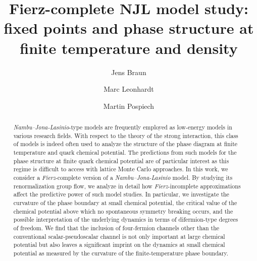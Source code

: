 \documentclass[prd,english,preprintnumbers,amsmath,amssymb,nofootinbib,twocolumn,superscriptaddress]{revtex4-1}
\begin{document}
\title{Fierz-complete NJL model study:\\ fixed points and phase structure at finite temperature
and density}

\author{Jens Braun}
\author{Marc Leonhardt} 
\author{Martin Pospiech}

%
\begin{abstract}
%
{\it Nambu--Jona-Lasinio}-type models are frequently employed as low-energy models in 
various research fields. With respect to the theory of the strong interaction, this class
of models is indeed often used to analyze the structure of the phase diagram at 
finite temperature and quark chemical potential. The predictions from such models for the 
phase structure at finite quark chemical potential 
are of particular interest as this regime is difficult to access with lattice Monte Carlo approaches.
 In this work, we consider a {\it Fierz}-complete version of a 
{\it Nambu--Jona-Lasinio} model. By studying its renormalization group flow,
we analyze in detail how {\it Fierz}-incomplete approximations affect the predictive power of such model studies. 
In particular, we investigate the curvature of the phase
boundary at small chemical potential, the critical value of the chemical potential above which no spontaneous
symmetry breaking occurs, and the possible interpretation of the underlying dynamics in terms of 
difermion-type degrees of freedom. {We find that the inclusion of four-fermion channels other than the 
conventional scalar-pseudoscalar channel is not only important at large chemical potential but also leaves a significant
{imprint on the dynamics} at small chemical potential as measured by the curvature of the finite-temperature phase boundary.}
%
\end{abstract}
%

\maketitle

% 
\end{document}
